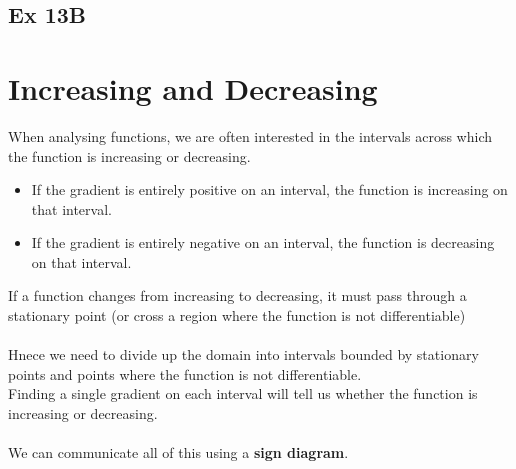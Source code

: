 \documentclass[11pt]{report}
\newcommand{\x}{0}
\begin{document}
\begin{center}


\end{center}
\subsection{Ex 13B}
\newpage
 
\newpage
\section{Increasing and Decreasing}
When analysing functions, we are often interested in the intervals across which the function is  increasing or  decreasing.
\begin{itemize}
	\item If the gradient is entirely positive on an interval, the function is increasing on that interval.
	\item If the gradient is entirely negative on an interval, the function is decreasing on that interval.
\end{itemize}
If a function changes from increasing to decreasing, it must pass through a stationary point (or cross a region where the function is not differentiable)\\\\
Hnece we need to divide up the domain into intervals bounded by stationary points  and points where the function is not differentiable.\\
Finding a single gradient on each interval will tell us whether the function is increasing or decreasing.\\\\
We can communicate all of this using a \textbf{sign diagram}.\\\\
\end{document}
